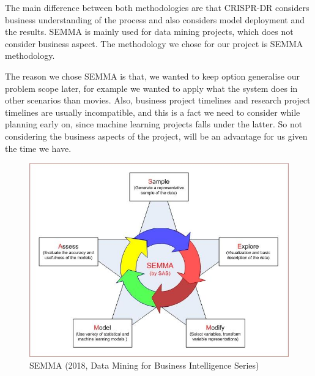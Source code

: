\documentclass[12pt,a4paper,man]{report}
\begin{document}
The main difference between both methodologies are that CRISPR-DR considers business understanding of the process and also considers model deployment and the results. SEMMA is mainly used for data mining projects, which does not consider business aspect. The methodology we chose for our project is SEMMA methodology.

The reason we chose SEMMA is that, we wanted to keep option generalise our problem scope later, for example we wanted to apply what the system does in other scenarios than movies. Also, business project timelines and research project timelines are usually incompatible, and this is a fact we need to consider while planning early on, since machine learning projects falls under the latter. So not considering the business aspects of the project, will be an advantage for us given the time we  have. 

\begin{figure}[htbp]
\centering
\includegraphics[width=6in]{./ext_img/SEMMA.JPG}
\caption{SEMMA (2018, Data Mining for Business Intelligence Series)}
\end{figure}
\end{document}
